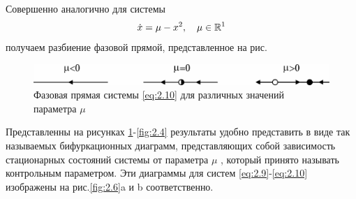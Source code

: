 Совершенно аналогично для системы
\begin{equation}
	\label{eq:2.10}
	\dot x= \mu - x^2, \quad \mu \in \mathbb{R}^1	
\end{equation}
получаем разбиение фазовой прямой, представленное на рис.
\begin{figure}[h!]
 	\centering
 	\includegraphics[width=\linewidth]{fig/lect2/5}
 	\caption{Фазовая прямая системы \eqref{eq:2.10} для различных значений параметра $\mu$ }
 	\label{fig:2.5}
 \end{figure} 

 Представленны на рисунках \ref{fig:2.5}-\ref{fig:2.4} результаты удобно представить в виде так называемых бифуркационных диаграмм, представляющих собой зависимость стационарных состояний системы от параметра $\mu$ , который принято называть контрольным параметром. Эти диаграммы для систем \eqref{eq:2.9}-\eqref{eq:2.10} изображены на рис.\ref{fig:2.6}a и b соответственно.

